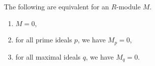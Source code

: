 The following are equivalent for an $R$-module $M$.
\begin{enumerate}[label=(\roman*)]
	\item $M = 0$,
	\item  for all prime ideals $p$, we have $M_p = 0$,
	\item for all maximal ideals $q$, we have $M_q = 0$.
\end{enumerate}
